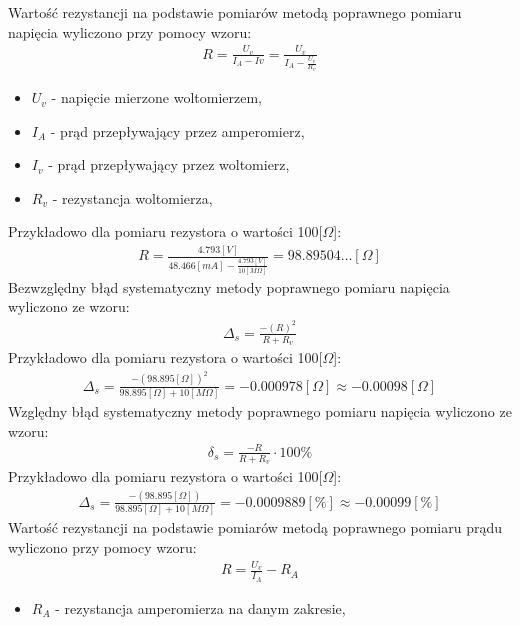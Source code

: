\documentclass[11pt]{article}
\begin{document}
    Wartość rezystancji na podstawie pomiarów metodą poprawnego pomiaru napięcia wyliczono przy pomocy wzoru:
    \begin{gather*}
        R=\frac{U_v}{I_A-Iv}=\frac{U_v}{I_A-\frac{U_v}{R_v}}
    \end{gather*}
    {\footnotesize
        \begin{itemize}
            \setlength\itemsep{0em}
            \item[] \boldmath$U_v$ - napięcie mierzone woltomierzem,
            \item[] \boldmath$I_A$ - prąd przepływający przez amperomierz,
            \item[] \boldmath$I_v$ - prąd przepływający przez woltomierz,
            \item[] \boldmath$R_v$ - rezystancja woltomierza,
        \end{itemize}}
    Przykładowo dla pomiaru rezystora o wartości 100[$\Omega$]:
    \begin{gather*}
        R=\frac{4.793[V]}{48.466[mA]-\frac{4.793[V]}{10[M\Omega]}}=98.89504\dots[\Omega]
    \end{gather*}
    Bezwzględny błąd systematyczny metody poprawnego pomiaru napięcia wyliczono ze wzoru:
    \begin{gather*}
        \Delta_s=\frac{-(R)^2}{R+R_v}
    \end{gather*}
    Przykładowo dla pomiaru rezystora o wartości 100[$\Omega$]:
    \begin{gather*}
        \Delta_s=\frac{-(98.895[\Omega])^2}{98.895[\Omega]+10[M\Omega]}=-0.000978[\Omega]\approx -0.00098[\Omega]
    \end{gather*}
    Względny błąd systematyczny metody poprawnego pomiaru napięcia wyliczono ze wzoru:
    \begin{gather*}
        \delta_s=\frac{-R}{R+R_v}\cdot 100\%
    \end{gather*}
    Przykładowo dla pomiaru rezystora o wartości 100[$\Omega$]:
    \begin{gather*}
        \Delta_s=\frac{-(98.895[\Omega])}{98.895[\Omega]+10[M\Omega]}=-0.0009889[\%]\approx -0.00099[\%]
    \end{gather*}
    Wartość rezystancji na podstawie pomiarów metodą poprawnego pomiaru prądu wyliczono przy pomocy wzoru:
    \begin{gather*}
        R=\frac{U_v}{I_A}-R_A
    \end{gather*}
    {\footnotesize
        \begin{itemize}
            \setlength\itemsep{0em}
            \item[] \boldmath$R_A$ - rezystancja amperomierza na danym zakresie,
        \end{itemize}}
\end{document}
